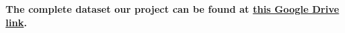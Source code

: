 \textbf{The complete dataset our project can be found at \href{https://drive.google.com/drive/folders/1-NH5rOB6CmhRUDG_SNe7LSXv1LgAC3d2?usp=sharing}{this Google Drive link}.}


